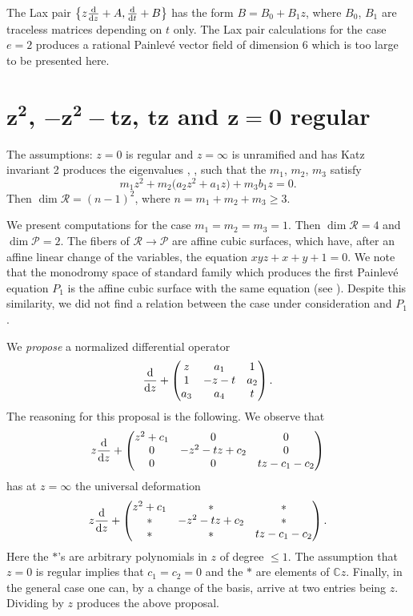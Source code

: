 \documentclass[10pt,a4paper]{amsart}
\numberwithin{equation}{section}
\begin{document}
The Lax pair $\bigl\{ z\frac{{\rm d}}{{\rm d}z}+A,\frac{{\rm d}}{{\rm d}t}+B\bigr\}$ has the form $B=B_0+B_1z$, where $B_0$, $B_1$ are traceless matrices depending on $t$ only. The Lax pair calculations for the case $e=2$ produces a rational Painlev\'e vector field of dimension 6 which is too large to be presented here.

\section[z*z, -z*z-tz, tz and z=0 regular]{$\boldsymbol{z^2}$, $\boldsymbol{-z^2-tz}$, $\boldsymbol{tz}$ and $\boldsymbol{z=0}$ regular}\label{nine}

The assumptions: $z=0$ is regular and $z=\infty$ is unramified and has Katz invariant 2 produces the eigenvalues
, ,  such that the $m_1$, $m_2$, $m_3$ satisfy
\[
m_1z^2+m_2\bigl(a_2z^2+a_1z\bigr)+m_3b_1z=0.
\]
 Then $\dim \mathcal{R}=(n-1)^2$, where $n=m_1+m_2+m_3\geq 3$.

 We present computations for the case
$m_1=m_2=m_3=1$. Then $\dim \mathcal{R}=4$ and $\dim \mathcal{P}=2$. The fibers of $\mathcal{R}\rightarrow \mathcal{P}$ are
affine cubic surfaces, which have, after an affine linear change of the variables, the equation $xyz+x+y+1=0$.
We note that the monodromy space of standard family which produces the first Painlev\'e equation $P_1$ is the affine cubic surface with the same equation (see \cite[Section~3.10]{vdP-Sa}). Despite this similarity, we did not find a relation between the case under consideration and $P_1$.


We {\it propose} a normalized differential operator
\[ \frac{{\rm d}}{{\rm d}z}+ \begin{pmatrix} z &a_1 &1 \\ 1&-z-t &a_2 \\ a_3& a_4& t \end{pmatrix}.\]
The reasoning for this proposal is the following. We observe that
\[z\frac{{\rm d}}{{\rm d}z}+ \begin{pmatrix} z^2+c_1 &0 &0 \\ 0&-z^2-tz+c_2 &0 \\ 0& 0& tz-c_1-c_2 \end{pmatrix}\] has at $z=\infty$ the universal deformation
\[z\frac{{\rm d}}{{\rm d}z}+ \begin{pmatrix} z^2+c_1 &* &* \\ *&-z^2-tz+c_2 &* \\ *& *& tz-c_1-c_2 \end{pmatrix}.\]
Here the $*$'s are arbitrary polynomials in $z$ of degree $\leq 1$. The assumption that $z=0$ is regular implies that
$c_1=c_2=0$ and the $*$ are elements of $\mathbb{C}z$. Finally, in the general case one can, by a change of the basis,
 arrive at two entries being $z$. Dividing by $z$ produces the above proposal.
\end{document}
